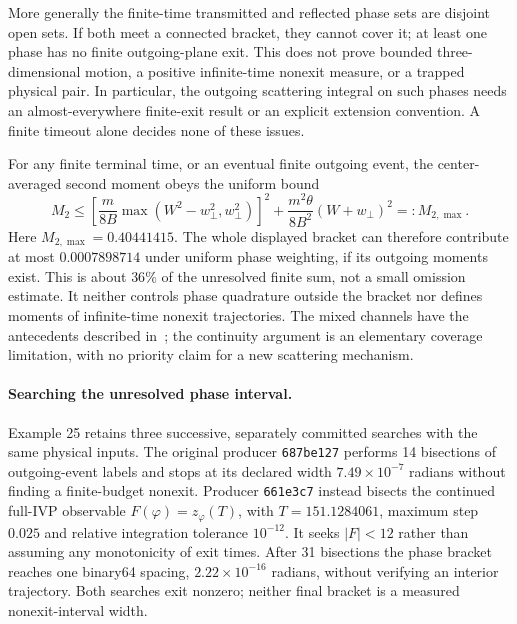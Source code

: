 \documentclass[11pt,letterpaper]{article}
\begin{document}
More generally the finite-time transmitted and reflected phase sets are
disjoint open sets. If both meet a connected bracket, they cannot cover it;
at least one phase has no finite outgoing-plane exit. This does not prove
bounded three-dimensional motion, a positive infinite-time nonexit measure,
or a trapped physical pair. In particular, the outgoing scattering integral
on such phases needs an almost-everywhere finite-exit result or an explicit
extension convention. A finite timeout alone decides none of these issues.

For any finite terminal time, or an eventual finite outgoing event, the
center-averaged second moment obeys the uniform bound
\begin{equation}
 M_2\le
 \left[\frac{m}{8B}\max(W^2-w_\perp^2,w_\perp^2)\right]^2
 +\frac{m^2\theta}{8B^2}(W+w_\perp)^2=:M_{2,\max}.
\end{equation}
Here $M_{2,\max}=0.40441415$. The whole displayed bracket can therefore
contribute at most $0.0007898714$ under uniform phase weighting, if its
outgoing moments exist. This is about $36\%$ of the unresolved finite sum,
not a small omission estimate. It neither controls phase quadrature outside
the bracket nor defines moments of infinite-time nonexit trajectories.
The mixed channels have the antecedents described in~\cite{NZ09,NZ10};
the continuity argument is an elementary coverage limitation, with no
priority claim for a new scattering mechanism.

\paragraph{Searching the unresolved phase interval.}
Example 25 retains three successive, separately committed searches with the
same physical inputs. The original producer \texttt{687be127} performs 14
bisections of outgoing-event labels and stops at its declared width
$7.49\times10^{-7}$ radians without finding a finite-budget nonexit.
Producer \texttt{661e3c7} instead bisects the continued full-IVP observable
$F(\varphi)=z_\varphi(T)$, with $T=151.1284061$, maximum step $0.025$ and
relative integration tolerance $10^{-12}$. It seeks $|F|<12$ rather than
assuming any monotonicity of exit times. After 31 bisections the phase
bracket reaches one binary64 spacing, $2.22\times10^{-16}$ radians,
without verifying an interior trajectory. Both searches exit nonzero;
neither final bracket is a measured nonexit-interval width.
\end{document}
